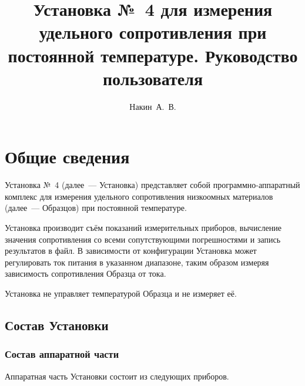 \documentclass[12pt, a4paper, twocolumn]{report}
\title{Установка №~4 для измерения удельного сопротивления при постоянной температуре. Руководство пользователя}
\author{Накин~А.~В.}
\begin{document}
\maketitle

\tableofcontents

\chapter{Общие сведения}

Установка №~4 (далее~--- Установка) представляет собой программно-аппаратный комплекс для измерения удельного сопротивления низкоомных материалов (далее~--- Образцов) при постоянной температуре.

Установка производит съём показаний измерительных приборов, вычисление значения сопротивления со всеми сопутствующими погрешностями и запись результатов в файл. В зависимости от конфигурации Установка может регулировать ток питания в указанном диапазоне, таким образом измеряя зависимость сопротивления Образца от тока.

Установка не управляет температурой Образца и не измеряет её.

\section{Состав Установки}

\subsection{Состав аппаратной части}

Аппаратная часть Установки состоит из следующих приборов.
\end{document}
